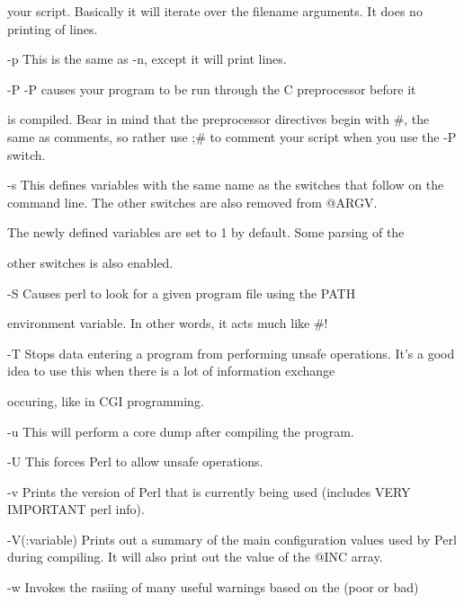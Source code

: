 \documentclass[a4paper,11pt]{book}
\begin{document}
\noindent your script. Basically it will iterate over the filename arguments. It does no printing of lines.

\noindent 

\noindent -p This is the same as -n, except it will print lines.

\noindent 

\noindent -P -P causes your program to be run through the C preprocessor before it

\noindent is compiled. Bear in mind that the preprocessor directives begin with \#, the same as comments, so rather use ;\# to comment your script when you use the -P switch.

\noindent 

\noindent -s This defines variables with the same name as the switches that follow on the command line. The other switches are also removed from @ARGV.

\noindent The newly defined variables are set to 1 by default. Some parsing of the

\noindent other switches is also enabled.

\noindent 

\noindent -S Causes perl to look for a given program file using the PATH

\noindent environment variable. In other words, it acts much like \#!

\noindent 

\noindent -T Stops data entering a program from performing unsafe operations. It's a good idea to use this when there is a lot of information exchange

\noindent occuring, like in CGI programming.

\noindent 

\noindent -u This will perform a core dump after compiling the program.

\noindent 

\noindent -U This forces Perl to allow unsafe operations.

\noindent 

\noindent -v Prints the version of Perl that is currently being used (includes VERY IMPORTANT perl info).

\noindent 

\noindent -V(:variable) Prints out a summary of the main configuration values used by Perl during compiling. It will also print out the value of the @INC array.

\noindent 

\noindent -w Invokes the rasiing of many useful warnings based on the (poor or bad)
\end{document}
